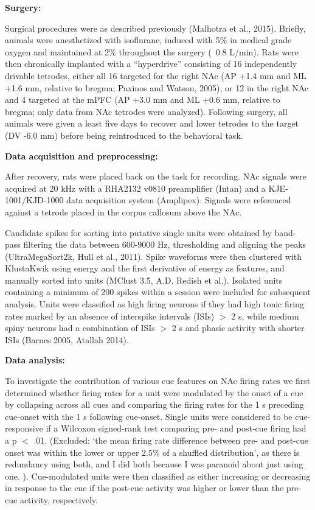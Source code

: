 \documentclass[11pt]{article}
\begin{document}
\begin{figure}[h]
\label{fig:task}
\end{figure}
{\bf Surgery:}

Surgical procedures were as described previously (Malhotra et al., 2015). Briefly, animals were anesthetized with isoflurane, induced with 5\% in medical grade oxygen and maintained at 2\% throughout the surgery (~0.8 L/min). Rats were then chronically implanted with a “hyperdrive” consisting of 16 independently drivable tetrodes, either all 16 targeted for the right NAc (AP +1.4 mm and ML +1.6 mm, relative to bregma; Paxinos and Watson, 2005), or 12 in the right NAc and 4 targeted at the mPFC (AP +3.0 mm and ML +0.6 mm, relative to bregma; only data from NAc tetrodes were analyzed). Following surgery, all animals were given a least five days to recover and lower tetrodes to the target (DV -6.0 mm) before being reintroduced to the behavioral task.

{\bf Data acquisition and preprocessing:}

After recovery, rats were placed back on the task for recording. NAc signals were acquired at 20 kHz with a RHA2132 v0810 preamplifier (Intan) and a KJE-1001/KJD-1000 data acquisition system (Amplipex). Signals were referenced against a tetrode placed in the corpus callosum above the NAc.

Candidate spikes for sorting into putative single units were obtained by band-pass filtering the data between 600-9000 Hz, thresholding and aligning the peaks (UltraMegaSort2k, Hull et al., 2011). Spike waveforms were then clustered with KlustaKwik using energy and the first derivative of energy as features, and manually sorted into units (MClust 3.5, A.D. Redish et al.). Isolated units containing a minimum of 200 spikes within a session were included for subsequent analysis. Units were classified as high firing neurons if they had high tonic firing rates marked by an absence of interspike intervals (ISIs) $>$ 2 s, while medium spiny neurons had a combination of ISIs $>$ 2 s and phasic activity with shorter ISIs (Barnes 2005, Atallah 2014). 

{\bf Data analysis:}

To investigate the contribution of various cue features on NAc firing rates we first determined whether firing rates for a unit were modulated by the onset of a cue by collapsing across all cues and comparing the firing rates for the 1 s preceding cue-onset with the 1 s following cue-onset. Single units were considered to be cue-responsive if a Wilcoxon signed-rank test comparing pre- and post-cue firing had a p $<$ .01. (Excluded: ‘the mean firing rate difference between pre- and post-cue onset was within the lower or upper 2.5\% of a shuffled distribution’, as there is redundancy using both, and I did both because I was paranoid about just using one. ). Cue-modulated units were then classified as either increasing or decreasing in response to the cue if the post-cue activity was higher or lower than the pre-cue activity, respectively. 
\end{document}
